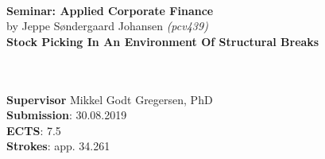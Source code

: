 \documentclass[12pt,oneside]{article}
\begin{document}

    \thispagestyle{empty}
    \vspace*{3.75cm}
    \textbf{\large\\ Seminar: Applied Corporate Finance}\\
    \vspace*{0.1cm}
    by Jeppe Søndergaard Johansen \textit{(pcv439)} \hspace{1.0cm}
    \vspace*{2.75cm}\\
    \textbf{\LARGE Stock Picking In An Environment Of Structural Breaks} \\
    \vspace*{0.1cm} \\
    \begin{tabbing}
    \\[7.55cm]
    \textbf{Supervisor} Mikkel Godt Gregersen, PhD \\
    \textbf{Submission}: 30.08.2019\\
    \textbf{ECTS}: 7.5\\
    \textbf{Strokes}: app. 34.261\\
    \end{tabbing}
    \newpage
    \ClearWallPaper
\end{document}
